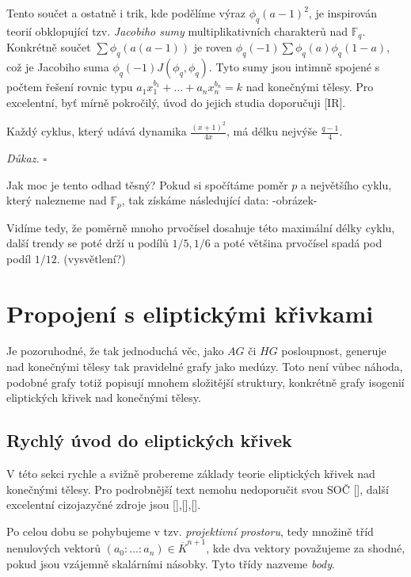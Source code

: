 \documentclass[12pt]{report}
\begin{document}
\begin{poznamka}
Tento součet a ostatně i trik, kde podělíme výraz $\phi_q (a-1)^2$, je inspirován teorií obklopující tzv. \textit{Jacobiho sumy} multiplikativních charakterů nad $\mathbb{F}_q$. Konkrétně součet $\sum \phi_q (a(a-1))$ je roven $\phi_q (-1) \sum \phi_q (a) \phi_q (1-a)$, což je Jacobiho suma $\phi_q (-1) J(\phi_q, \phi_q)$. Tyto sumy jsou intimně spojené s počtem řešení rovnic typu $a_1 x_1 ^{b_1} + \dots + a_n x_n ^{b_n} = k$ nad konečnými tělesy. Pro excelentní, byť mírně pokročilý, úvod do jejich studia doporučuji [IR]. 
\end{poznamka}

\begin{dusledek}
Každý cyklus, který udává dynamika $\frac{(x+1)^2}{4x}$, má délku nejvýše $\frac{q-1}{4}$.
\end{dusledek}

\noindent \textit{Důkaz.}
\hfill $\square$


Jak moc je tento odhad těsný? Pokud si spočítáme poměr $p$ a největšího cyklu, který nalezneme nad $\mathbb{F}_p$, tak získáme následující data:
-obrázek-

Vidíme tedy, že poměrně mnoho prvočísel dosahuje této maximální délky cyklu, další trendy se poté drží u podílů $1/5, 1/6$ a poté většina prvočísel spadá pod podíl $1/12$. (vysvětlení?)


\chapter{Propojení s eliptickými křivkami}

Je pozoruhodné, že tak jednoduchá věc, jako $AG$ či $HG$ posloupnost, generuje nad konečnými tělesy tak pravidelné grafy jako medúzy. Toto není vůbec náhoda, podobné grafy totiž popisují mnohem složitější struktury, konkrétně grafy isogenií eliptických křivek nad konečnými tělesy.

\section{Rychlý úvod do eliptických křivek}
V této sekci rychle a svižně probereme základy teorie eliptických křivek nad konečnými tělesy. Pro podrobnější text nemohu nedoporučit svou SOČ [], další excelentní cizojazyčné zdroje jsou [],[],[].

Po celou dobu se pohybujeme v tzv. \textit{projektivní prostoru}, tedy množině tříd nenulových vektorů $(a_0: \dots: a_n) \in \overline{K}^{n+1}$, kde dva vektory považujeme za shodné, pokud jsou vzájemně skalárními násobky. Tyto třídy nazveme \textit{body}.
\end{document}
